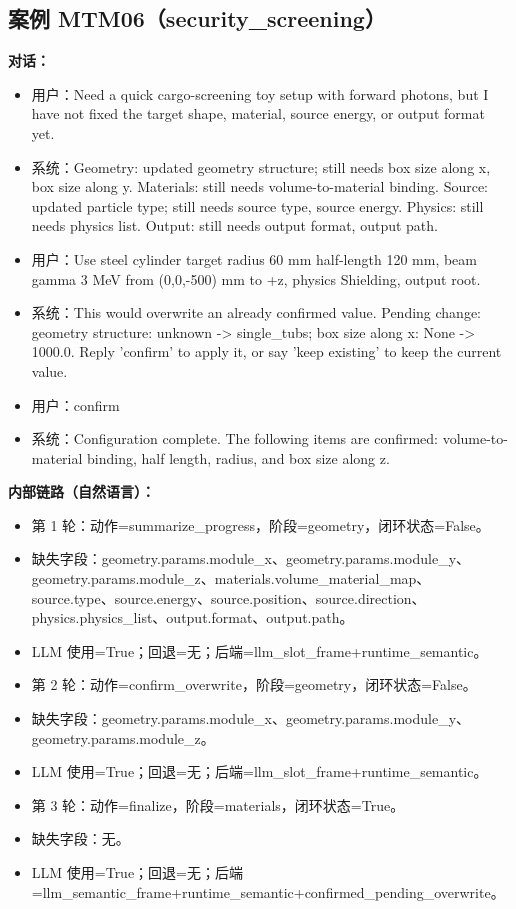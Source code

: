 \documentclass[11pt]{ctexart}
\begin{document}
\subsection{案例 MTM06（security\_screening）}
\textbf{对话：}
\begin{itemize}
\item 用户：Need a quick cargo-screening toy setup with forward photons, but I have not fixed the target shape, material, source energy, or output format yet.
\item 系统：Geometry: updated geometry structure; still needs box size along x, box size along y. Materials: still needs volume-to-material binding. Source: updated particle type; still needs source type, source energy. Physics: still needs physics list. Output: still needs output format, output path.
\item 用户：Use steel cylinder target radius 60 mm half-length 120 mm, beam gamma 3 MeV from (0,0,-500) mm to +z, physics Shielding, output root.
\item 系统：This would overwrite an already confirmed value. Pending change: geometry structure: unknown -> single\_tubs; box size along x: None -> 1000.0. Reply 'confirm' to apply it, or say 'keep existing' to keep the current value.
\item 用户：confirm
\item 系统：Configuration complete. The following items are confirmed: volume-to-material binding, half length, radius, and box size along z.
\end{itemize}
\textbf{内部链路（自然语言）：}
\begin{itemize}
\item 第 1 轮：动作=summarize\_progress，阶段=geometry，闭环状态=False。
\item 缺失字段：geometry.params.module\_x、geometry.params.module\_y、geometry.params.module\_z、materials.volume\_material\_map、source.type、source.energy、source.position、source.direction、physics.physics\_list、output.format、output.path。
\item LLM 使用=True；回退=无；后端=llm\_slot\_frame+runtime\_semantic。
\item 第 2 轮：动作=confirm\_overwrite，阶段=geometry，闭环状态=False。
\item 缺失字段：geometry.params.module\_x、geometry.params.module\_y、geometry.params.module\_z。
\item LLM 使用=True；回退=无；后端=llm\_slot\_frame+runtime\_semantic。
\item 第 3 轮：动作=finalize，阶段=materials，闭环状态=True。
\item 缺失字段：无。
\item LLM 使用=True；回退=无；后端=llm\_semantic\_frame+runtime\_semantic+confirmed\_pending\_overwrite。
\end{itemize}
\end{document}

